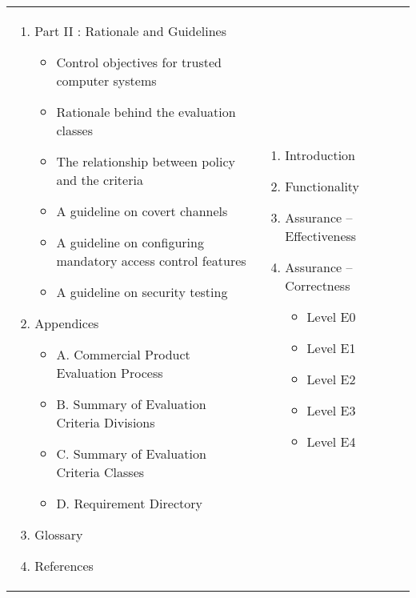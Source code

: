 \begin{table}[H]
\begin{center}
\begin{tabular}{|>{\small \sffamily}p{5.3cm}
                    |>{\small \sffamily}p{5.3cm}
                    |>{\small \sffamily}p{5.3cm}|}
\begin{enumerate}
\begin{itemize}
                \end{itemize}
            \item Part II : Rationale and Guidelines
                \begin{itemize}
                    \item Control objectives for trusted computer systems
                    \item Rationale behind the evaluation classes
                    \item The relationship between policy and the criteria
                    \item A guideline on covert channels
                    \item A guideline on configuring mandatory access control features
                    \item A guideline on security testing
                \end{itemize}
            \item Appendices
                \begin{itemize}
                    \item A. Commercial Product Evaluation Process
                    \item B. Summary of Evaluation Criteria Divisions
                    \item C. Summary of Evaluation Criteria Classes
                    \item D. Requirement Directory
                \end{itemize}
            \item Glossary
            \item References
        \end{enumerate} 
        &  
        \begin{enumerate}
            \item Introduction
            \item Functionality
            \item Assurance -- Effectiveness
            \item Assurance -- Correctness
                \begin{itemize}
                    \item Level E0
                    \item Level E1
                    \item Level E2
                    \item Level E3
                    \item Level E4

\end{itemize}
\end{enumerate}
\end{tabular}
\end{center}
\end{table}
